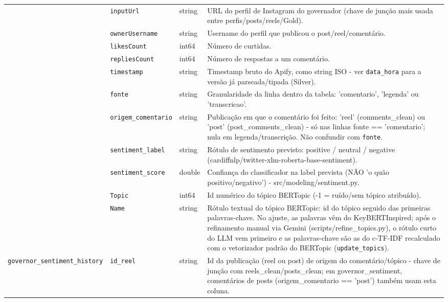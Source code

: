\begin{footnotesize}
\begin{longtable}{p{3.2cm}p{3.0cm}p{2.0cm}p{6.0cm}}
\texttt{} & \texttt{inputUrl} & string & URL do perfil de Instagram do governador (chave de junção mais usada entre perfis/\allowbreak{}posts/\allowbreak{}reels/\allowbreak{}Gold). \\
\texttt{} & \texttt{ownerUsername} & string & Username do perfil que publicou o post/\allowbreak{}reel/\allowbreak{}comentário. \\
\texttt{} & \texttt{likesCount} & int64 & Número de curtidas. \\
\texttt{} & \texttt{repliesCount} & int64 & Número de respostas a um comentário. \\
\texttt{} & \texttt{timestamp} & string & Timestamp bruto do Apify, como string ISO - ver \texttt{data\_\allowbreak{}hora} para a versão já parseada/\allowbreak{}tipada (Silver). \\
\texttt{} & \texttt{fonte} & string & Granularidade da linha dentro da tabela: 'comentario', 'legenda' ou 'transcricao'. \\
\texttt{} & \texttt{origem\_\allowbreak{}comentario} & string & Publicação em que o comentário foi feito: 'reel' (comments\_\allowbreak{}clean) ou 'post' (post\_\allowbreak{}comments\_\allowbreak{}clean) - só nas linhas fonte == 'comentario'; nula em legenda/\allowbreak{}transcrição. Não confundir com \texttt{fonte}. \\
\texttt{} & \texttt{sentiment\_\allowbreak{}label} & string & Rótulo de sentimento previsto: positive /\allowbreak{} neutral /\allowbreak{} negative (cardiffnlp/\allowbreak{}twitter-xlm-roberta-base-sentiment). \\
\texttt{} & \texttt{sentiment\_\allowbreak{}score} & double & Confiança do classificador na label prevista (NÃO 'o quão positivo/\allowbreak{}negativo') - src/\allowbreak{}modeling/\allowbreak{}sentiment.py. \\
\texttt{} & \texttt{Topic} & int64 & Id numérico do tópico BERTopic (-1 = ruído/\allowbreak{}sem tópico atribuído). \\
\texttt{} & \texttt{Name} & string & Rótulo textual do tópico BERTopic: id do tópico seguido das primeiras palavras-chave. No ajuste, as palavras vêm do KeyBERTInspired; após o refinamento manual via Gemini (scripts/\allowbreak{}refine\_\allowbreak{}topics.py), o rótulo curto do LLM vem primeiro e as palavras-chave são as do c-TF-IDF recalculado com o vetorizador padrão do BERTopic (\texttt{update\_\allowbreak{}topics}). \\
\texttt{governor\_\allowbreak{}sentiment\_\allowbreak{}history} & \texttt{id\_\allowbreak{}reel} & string & Id da publicação (reel ou post) de origem do comentário/\allowbreak{}tópico - chave de junção com reels\_\allowbreak{}clean/\allowbreak{}posts\_\allowbreak{}clean; em governor\_\allowbreak{}sentiment, comentários de posts (origem\_\allowbreak{}comentario == 'post') também usam esta coluna. \\

\end{longtable}
\end{footnotesize}
